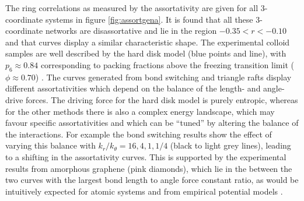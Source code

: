 The ring correlations as measured by the assortativity are given for all 3\-- coordinate systems in figure \ref{fig:assortgena}.
It is found that all these 3\-- coordinate networks are disassortative and lie in the region $-0.35<r<-0.10$ and that curves display a similar characteristic shape.
The experimental colloid samples are well described by the hard disk model (blue points and line), with $p_6\approx0.84$ corresponding to packing fractions above the freezing transition limit ($\phi\approx 0.70$) \cite{Bernard2011}.
The curves generated from bond switching and triangle rafts display different assortativities which depend on the balance of the length\-- and angle\--drive forces.
The driving force for the hard disk model is purely entropic, whereas for the other methods there is also a complex energy landscape, which may favour specific assortativities and which can be ``tuned'' by altering the balance of the interactions. 
For example the bond switching results show the effect of varying this balance with $k_r/k_\theta=16,4,1,1/4$ (black to light grey lines), leading to a shifting in the assortativity curves.
This is supported by the experimental results from amorphous graphene (pink diamonds), which lie in the between the two curves with the largest bond length to angle force constant ratio, as would be intuitively expected for atomic systems and from empirical potential models \cite{Kumar2012}.

